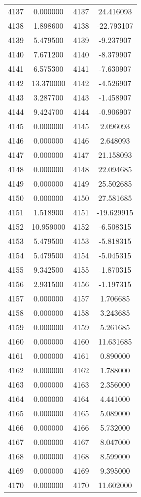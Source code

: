 \documentclass[12pt]{article}
\begin{document}
\begin{longtable}{@{}cccc@{}}
4137 & 0.000000 & 4137 & 24.416093 \\
4138 & 1.898600 & 4138 & -22.793107 \\
4139 & 5.479500 & 4139 & -9.237907 \\
4140 & 7.671200 & 4140 & -8.379907 \\
4141 & 6.575300 & 4141 & -7.630907 \\
4142 & 13.370000 & 4142 & -4.526907 \\
4143 & 3.287700 & 4143 & -1.458907 \\
4144 & 9.424700 & 4144 & -0.906907 \\
4145 & 0.000000 & 4145 & 2.096093 \\
4146 & 0.000000 & 4146 & 2.648093 \\
4147 & 0.000000 & 4147 & 21.158093 \\
4148 & 0.000000 & 4148 & 22.094685 \\
4149 & 0.000000 & 4149 & 25.502685 \\
4150 & 0.000000 & 4150 & 27.581685 \\
4151 & 1.518900 & 4151 & -19.629915 \\
4152 & 10.959000 & 4152 & -6.508315 \\
4153 & 5.479500 & 4153 & -5.818315 \\
4154 & 5.479500 & 4154 & -5.045315 \\
4155 & 9.342500 & 4155 & -1.870315 \\
4156 & 2.931500 & 4156 & -1.197315 \\
4157 & 0.000000 & 4157 & 1.706685 \\
4158 & 0.000000 & 4158 & 3.243685 \\
4159 & 0.000000 & 4159 & 5.261685 \\
4160 & 0.000000 & 4160 & 11.631685 \\
4161 & 0.000000 & 4161 & 0.890000 \\
4162 & 0.000000 & 4162 & 1.788000 \\
4163 & 0.000000 & 4163 & 2.356000 \\
4164 & 0.000000 & 4164 & 4.441000 \\
4165 & 0.000000 & 4165 & 5.089000 \\
4166 & 0.000000 & 4166 & 5.732000 \\
4167 & 0.000000 & 4167 & 8.047000 \\
4168 & 0.000000 & 4168 & 8.599000 \\
4169 & 0.000000 & 4169 & 9.395000 \\
4170 & 0.000000 & 4170 & 11.602000 \\

\end{longtable}
\end{document}
